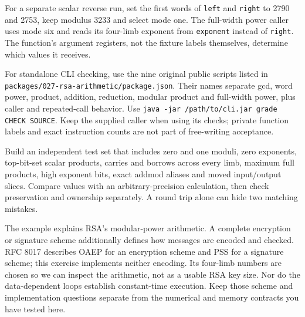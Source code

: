 For a separate scalar reverse run, set the first words of \texttt{left} and
\texttt{right} to 2790 and 2753, keep modulus 3233 and select mode one.
The full-width power caller uses mode six and reads its four-limb exponent from
\texttt{exponent} instead of \texttt{right}. The function's argument registers,
not the fixture labels themselves, determine which values it receives.

For standalone CLI checking, use the nine original public scripts listed in
\texttt{packages/027-rsa-arithmetic/package.json}. Their names separate gcd,
word power, product, addition, reduction, modular product and full-width power,
plus caller and repeated-call behavior. Use
\texttt{java -jar /path/to/cli.jar grade CHECK SOURCE}. Keep the supplied caller
when using its checks; private function labels and exact instruction counts are
not part of free-writing acceptance.

Build an independent test set that includes zero and one moduli, zero exponents,
top-bit-set scalar products, carries and borrows across every limb, maximum
full products, high exponent bits, exact addmod aliases and moved input/output
slices. Compare values with an arbitrary-precision calculation, then check
preservation and ownership separately. A round trip alone can hide two matching
mistakes.

The example explains RSA's modular-power arithmetic. A complete encryption or
signature scheme additionally defines how messages are encoded and checked.
RFC 8017 describes OAEP for an encryption scheme and PSS for a signature scheme;
this exercise implements neither encoding. Its four-limb numbers are chosen so
we can inspect the arithmetic, not as a usable RSA key size. Nor do the data-dependent
loops establish constant-time execution. Keep those scheme and implementation
questions separate from the numerical and memory contracts you have tested here.
